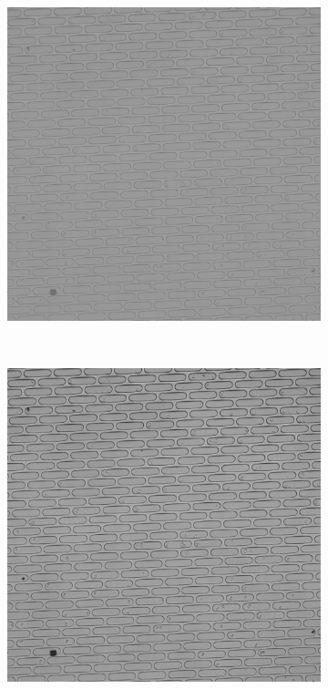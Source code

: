 \documentclass[pdftex,12pt,a4paper]{report}
\begin{document}
\begin{figure}[H]
\centering

\begin{subfigure}{0.4\textwidth}
  \centering
  \includegraphics[width=\textwidth]{images/pos_41_in_t0_br_up100}
  \caption{}
  \label{fig:pos41_brup100_bf}
\end{subfigure}%
~
\begin{subfigure}{0.4\textwidth}
  \centering
  \includegraphics[width=\textwidth]{images/pos_41_in_t0_br_times3}
  \caption{}
  \label{fig:pos41_times3_bf}
\end{subfigure}%


\end{figure}
\end{document}
